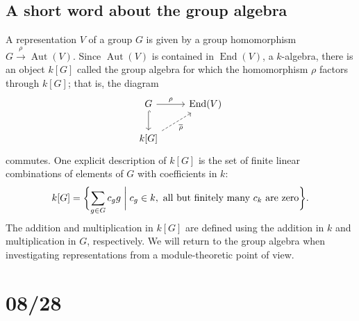 \documentclass[11pt,leqno]{article}
\theoremstyle{plain}
\theoremstyle{definition}
\numberwithin{equation}{section}
\numberwithin{lem}{section}
\DeclareMathOperator{\Aut}{Aut}
\DeclareMathOperator{\End}{End}
\begin{document}
\subsection{A short word about the group algebra}
A representation $V$ of a group $G$ is given by a group homomorphism $G\xrightarrow{\rho}\Aut(V)$. Since $\Aut(V)$ is contained in $\End(V)$, a $k$-algebra, there is an object $k[G]$ called the group algebra for which the homomorphism $\rho$ factors through $k[G]$; that is, the diagram 
\[\begin{tikzcd}
	G & {\End(V)} \\
	{k[G]}
	\arrow["\rho", from=1-1, to=1-2]
	\arrow[hook, from=1-1, to=2-1]
	\arrow["{\overline \rho}"', dashed, from=2-1, to=1-2]
\end{tikzcd}\]
commutes. One explicit description of $k[G]$ is the set of finite linear combinations of elements of $G$ with coefficients in $k$:
\[k[G] = \biggl\{\sum_{g\in G}c_gg \biggm\vert c_g\in k, \text{ all but finitely many $c_k$ are zero}\biggr\}.\]
The addition and multiplication in $k[G]$ are defined using the addition in $k$ and multiplication in $G$, respectively. We will return to the group algebra when investigating representations from a module-theoretic point of view.

\newpage\section{08/28}
\end{document}
